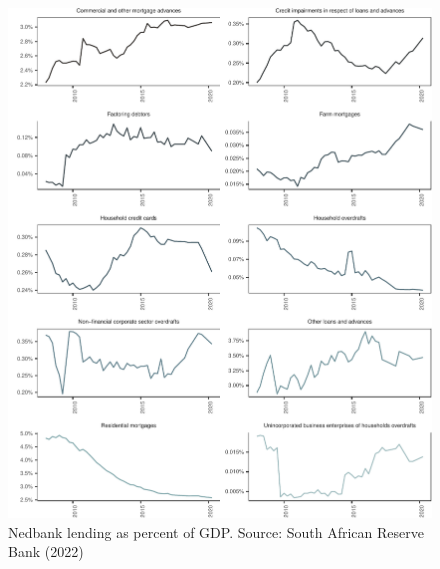 \documentclass[
]{article}
\begin{document}
\begin{figure}[H]

\includegraphics{Bank_capital_and_bank_lending_files/figure-latex/ba900gdpnedbank-1} \hfill{}

\caption{Nedbank lending as percent of GDP. Source: South African Reserve Bank (2022)}\label{fig:ba900gdpnedbank}
\end{figure}
\end{document}
